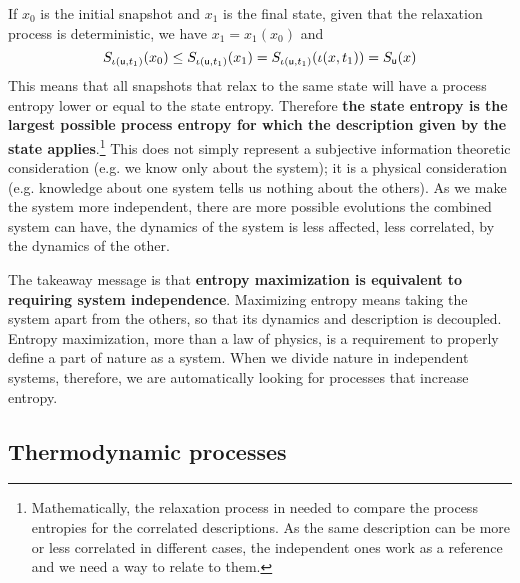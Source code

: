\documentclass[letterpaper]{article}
\begin{document}
If $x_0$ is the initial snapshot and $x_1$ is the final state, given that the relaxation process is deterministic, we have $x_1= x_1(x_0)$ and 
\begin{equation}
S_{\iota(\stmt[u], t_1)}(x_0) \leq S_{\iota(\stmt[u], t_1)}(x_1) = S_{\iota(\stmt[u], t_1)}(\iota( x, t_1)) = S_{\stmt[u]}(x)
\end{equation}
This means that all snapshots that relax to the same state will have a process entropy lower or equal to the state entropy. Therefore \textbf{the state entropy is the largest possible process entropy for which the description given by the state applies}.\footnote{Mathematically, the relaxation process in needed to compare the process entropies for the correlated descriptions. As the same description can be more or less correlated in different cases, the independent ones work as a reference and we need a way to relate to them.} This does not simply represent a subjective information theoretic consideration (e.g. we know only about the system); it is a physical consideration (e.g. knowledge about one system tells us nothing about the others). As we make the system more independent, there are more possible evolutions the combined system can have, the dynamics of the system is less affected, less correlated, by the dynamics of the other.

The takeaway message is that \textbf{entropy maximization is equivalent to requiring system independence}. Maximizing entropy means taking the system apart from the others, so that its dynamics and description is decoupled. Entropy maximization, more than a law of physics, is a requirement to properly define a part of nature as a system. When we divide nature in independent systems, therefore, we are automatically looking for processes that increase entropy.

\subsection{Thermodynamic processes}





\end{document}
